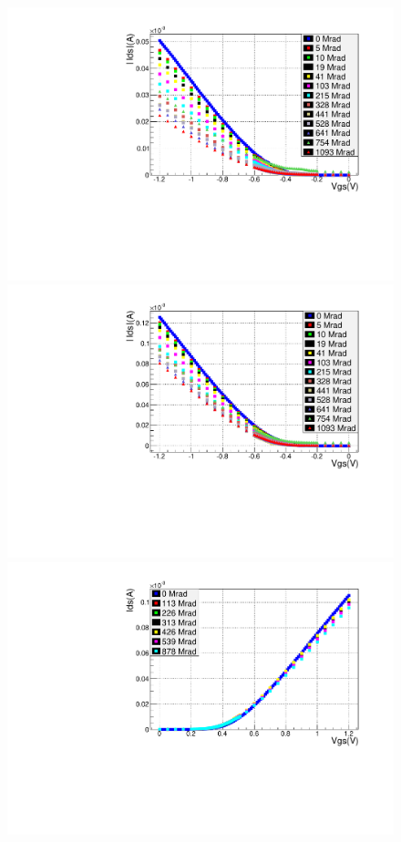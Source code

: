\begin{figure}
	\begin{minipage}[b]{.5\linewidth}
	\includegraphics[width=\linewidth]{pd012_2_comparison_paper.pdf}
	\end{minipage}
	\begin{minipage}[b]{.5\linewidth}
	\includegraphics[width=\linewidth]{pd036_2_comparison_paper.pdf}
	\end{minipage}
	\begin{minipage}[b]{.5\linewidth}
	\includegraphics[width=1\linewidth]{d024_1_comparison_paper.pdf}

\end{minipage}
\end{figure}

